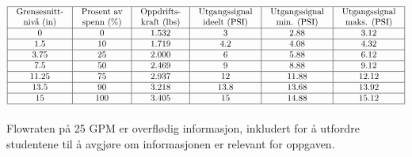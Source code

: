 $$\vbox{\offinterlineskip
\halign{\strut
\vrule \quad\hfil # \ \hfil & 
\vrule \quad\hfil # \ \hfil & 
\vrule \quad\hfil # \ \hfil & 
\vrule \quad\hfil # \ \hfil & 
\vrule \quad\hfil # \ \hfil & 
\vrule \quad\hfil # \ \hfil \vrule \cr
\noalign{\hrule}
%
Grensesnitt- & Prosent av & Oppdrifts- & Utgangssignal & Utgangssignal & Utgangssignal \cr
%
nivå (in) & spenn (\%) & kraft (lbs) & ideelt (PSI) & min. (PSI) & maks. (PSI) \cr
%
\noalign{\hrule}
%
0 & 0 & 1.532 & 3 & 2.88 & 3.12 \cr
%
\noalign{\hrule}
%
1.5 & 10 & 1.719 & 4.2 & 4.08 & 4.32 \cr
%
\noalign{\hrule}
%
3.75 & 25 & 2.000 & 6 & 5.88 & 6.12 \cr
%
\noalign{\hrule}
%
7.5 & 50 & 2.469 & 9 & 8.88 & 9.12 \cr
%
\noalign{\hrule}
%
11.25 & 75 & 2.937 & 12 & 11.88 & 12.12 \cr
%
\noalign{\hrule}
%
13.5 & 90 & 3.218 & 13.8 & 13.68 & 13.92 \cr
%
\noalign{\hrule}
%
15 & 100 & 3.405 & 15 & 14.88 & 15.12 \cr
%
\noalign{\hrule}
} %
}$$ %

\vskip 10pt

Flowraten på 25 GPM er overflødig informasjon, inkludert for å utfordre studentene til å avgjøre om informasjonen er relevant for oppgaven.


